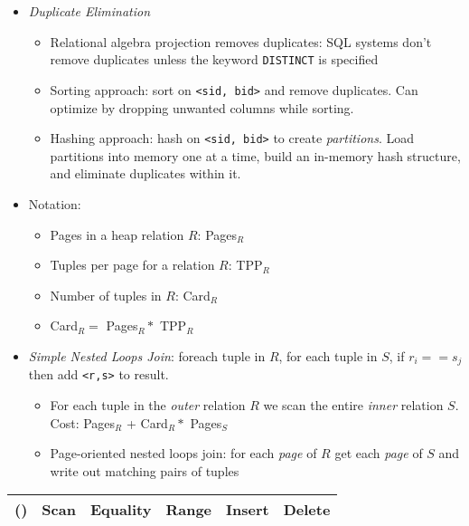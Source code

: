 \documentclass[landscape,8pt]{extarticle}
\newcommand{\code}{\lstinline}
\begin{document}
\begin{multicols}{4}
\begin{itemize}
\begin{itemize}
\begin{itemize}
            \end{itemize}
            \item \emph{Duplicate Elimination}
            \begin{itemize}
                \item Relational algebra projection removes duplicates: SQL systems don't remove duplicates unless the keyword \code{DISTINCT} is specified
                \item Sorting approach: sort on \code{<sid, bid>} and remove duplicates. Can optimize by dropping unwanted columns while sorting.
                \item Hashing approach: hash on \code{<sid, bid>} to create \emph{partitions}. Load partitions into memory one at a time, build an in-memory hash structure, and eliminate duplicates within it.
            \end{itemize}
            \item Notation:
            \begin{itemize}
                \item Pages in a heap relation $R$: Pages$_R$
                \item Tuples per page for a relation $R$: TPP$_R$
                \item Number of tuples in $R$: Card$_R$
                \item Card$_R = $ Pages$_R * $ TPP$_R$
            \end{itemize}
            \item \emph{Simple Nested Loops Join}: foreach tuple in $R$, for each tuple in $S$, if $r_i == s_j$ then add \code{<r,s>} to result.
            \begin{itemize}
                \item For each tuple in the \emph{outer} relation $R$ we scan the entire \emph{inner} relation $S$. Cost: Pages$_R$ + Card$_R * $ Pages$_S$
                \item Page-oriented nested loops join: for each \emph{page} of $R$ get each \emph{page} of $S$ and write out matching pairs of tuples
            \end{itemize}
        \end{itemize}
    \end{itemize}
    \begin{center}
        \begin{adjustbox}{angle=270}
            \begin{tabular}{ | c | c | c | c | c | c | } \hline
                ()            & Scan          & Equality              & Range                                    & Insert        & Delete        \\ \hline

\end{tabular}
\end{adjustbox}
\end{center}
\end{multicols}
\end{document}
